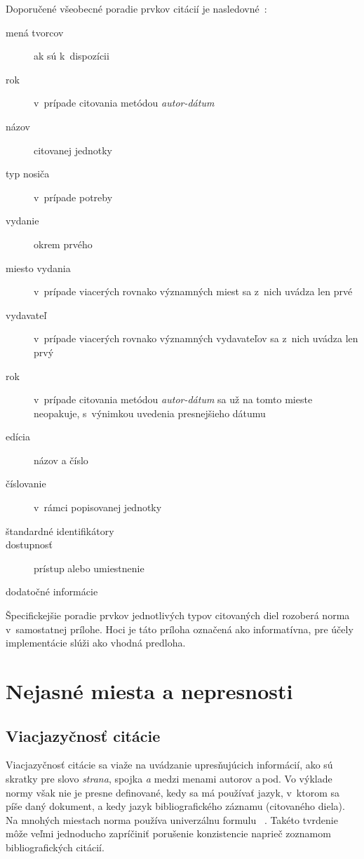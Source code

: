 \documentclass[
  color,
  table,
  nolof,
  oneside,
]{fithesis3}
\begin{document}
Doporučené všeobecné poradie prvkov citácií je nasledovné~\cite{csn:iso690:2011}:

\begin{description}
\item[mená tvorcov] ak sú k~dispozícii
\item[rok] v~prípade citovania metódou \emph{autor-dátum}
\item[názov] citovanej jednotky
\item[typ nosiča] v~prípade potreby
\item[vydanie] okrem prvého
\item[miesto vydania] v~prípade viacerých rovnako významných miest sa z~nich uvádza len prvé
\item[vydavateľ] v~prípade viacerých rovnako významných vydavateľov sa z~nich uvádza len prvý
\item[rok] v~prípade citovania metódou \emph{autor-dátum} sa už na tomto mieste neopakuje, s~výnimkou uvedenia presnejšieho dátumu
\item[edícia] názov a číslo
\item[číslovanie] v~rámci popisovanej jednotky
\item[štandardné identifikátory]
\item[dostupnosť] prístup alebo umiestnenie
\item[dodatočné informácie]
\end{description}

Špecifickejšie poradie prvkov jednotlivých typov citovaných diel rozoberá norma v~samostatnej prílohe. Hoci je táto príloha označená ako informatívna, pre účely implementácie slúži ako vhodná predloha. %


\section{Nejasné miesta a nepresnosti}\label{norm:ambiguous}

\subsection{Viacjazyčnosť citácie}

Viacjazyčnosť citácie sa viaže na uvádzanie upresňujúcich informácií, ako sú skratky pre slovo \emph{strana}, spojka \emph{a} medzi menami autorov a\,pod. Vo výklade normy však nie je presne definované, kedy sa má používať jazyk, v~ktorom sa píše daný dokument, a kedy jazyk bibliografického záznamu (citovaného diela). Na mnohých miestach norma používa univerzálnu formulu ~\cite{csn:iso690:2011}. Takéto tvrdenie môže veľmi jednoducho zapríčiniť porušenie konzistencie naprieč zoznamom bibliografických citácií.
\end{document}

